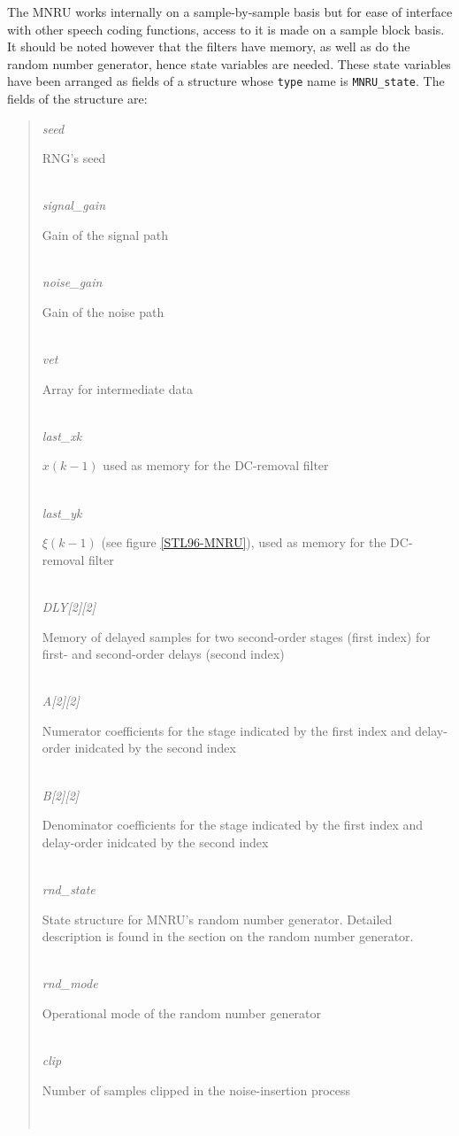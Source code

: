 The MNRU works internally on a sample-by-sample basis but for ease of
interface with other speech coding functions, access to it is made on
a sample block basis. It should be noted however that the filters have
memory, as well as do the random number generator, hence state
variables are needed. These state variables have been arranged as
fields of a structure whose {\tt type} name is {\tt MNRU\_state}. The
fields of the structure are:
\begin{quote} \normalsize
 {\em seed}     \hfill \parbox{100mm}{\SF RNG's seed }\\
 {\em signal\_gain}     \hfill \parbox{100mm}{\SF Gain of the signal path }\\
 {\em noise\_gain}      \hfill \parbox{100mm}{\SF Gain of the noise path }\\
 {\em vet}      \hfill \parbox{100mm}{\SF Array for intermediate data }\\
 {\em last\_xk} \hfill \parbox[t]{100mm}{\SF $x(k-1)$ used as memory for
                            the DC-removal filter }\\
 {\em last\_yk}\hfill \parbox[t]{100mm}{\SF $\xi(k-1)$ (see figure
                            \ref{STL96-MNRU}), used as memory for the
                            DC-removal filter}\\
 {\em DLY[2][2]}      \hfill \parbox[t]{100mm}{\SF Memory of delayed
                            samples for two second-order stages (first
                            index) for first- and second-order delays
                            (second index)}\\
 {\em A[2][2]}  \hfill \parbox[t]{100mm}{\SF Numerator coefficients for
                            the stage indicated by the first index and
                            delay-order inidcated by the second index}\\
 {\em B[2][2]}  \hfill \parbox[t]{100mm}{\SF Denominator coefficients for
                            the stage indicated by the first index and
                            delay-order inidcated by the second index}\\
 {\em rnd\_state}  \hfill \parbox[t]{100mm}{\SF State structure for MNRU's
                            random number generator. Detailed
                            description is found in the section on the
                            random number generator.}\\
 {\em rnd\_mode}   \hfill \parbox[t]{100mm}{\SF Operational mode of the
                            random number generator}\\
 {\em clip}     \hfill \parbox[t]{100mm}{\SF Number of samples clipped in
                            the noise-insertion process}\\
\end{quote}

